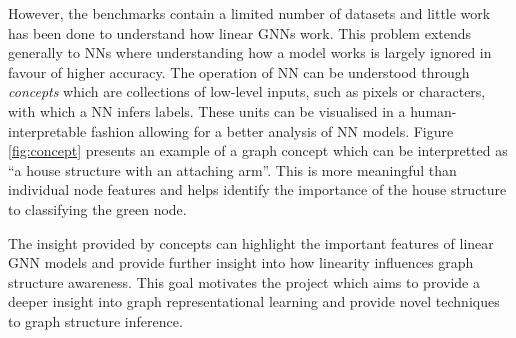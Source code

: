 
However, the benchmarks contain a limited number of datasets and little work has been done to understand how linear GNNs work.
This problem extends generally to NNs where understanding how a model works is largely ignored in favour of higher accuracy.
The operation of NN can be understood through \emph{concepts} which are collections of low-level inputs, such as pixels or characters,~\cite{ghorbani2019towards} with which a NN infers labels.
These units can be visualised in a human-interpretable fashion allowing for a better analysis of NN models.
Figure \ref{fig:concept} presents an example of a graph concept which can be interpretted as ``a house structure with an attaching arm''.
This is more meaningful than individual node features and helps identify the importance of the house structure to classifying the green node.

The insight provided by concepts can highlight the important features of linear GNN models and provide further insight into how linearity influences graph structure awareness.
This goal motivates the project which aims to provide a deeper insight into graph representational learning and provide novel techniques to graph structure inference.


